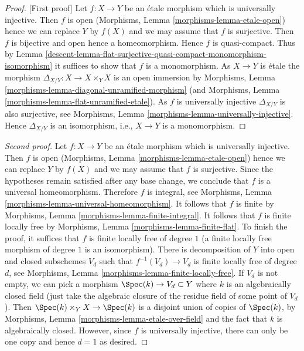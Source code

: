 \begin{proof}
[First proof]
Let $f : X \to Y$ be an \'etale morphism which is universally injective.
Then $f$ is open
(Morphisms, Lemma \ref{morphisms-lemma-etale-open})
hence we can replace $Y$ by $f(X)$ and we may assume that $f$ is surjective.
Then $f$ is bijective and open hence a homeomorphism. Hence $f$ is
quasi-compact. Thus by
Lemma \ref{descent-lemma-flat-surjective-quasi-compact-monomorphism-isomorphism}
it suffices to show that $f$ is a monomorphism. As $X \to Y$ is \'etale
the morphism $\Delta_{X/Y} : X \to X \times_Y X$ is an open immersion by
Morphisms, Lemma \ref{morphisms-lemma-diagonal-unramified-morphism}
(and
Morphisms, Lemma \ref{morphisms-lemma-flat-unramified-etale}).
As $f$ is universally injective $\Delta_{X/Y}$ is also surjective, see
Morphisms, Lemma \ref{morphisms-lemma-universally-injective}.
Hence $\Delta_{X/Y}$ is an isomorphism, i.e., $X \to Y$ is a monomorphism.
\end{proof}

\begin{proof}[Second proof]
Let $f : X \to Y$ be an \'etale morphism which is universally injective.
Then $f$ is open (Morphisms, Lemma \ref{morphisms-lemma-etale-open})
hence we can replace $Y$ by $f(X)$ and we may assume that $f$ is surjective.
Since the hypotheses remain satisfied after any base change, we conclude
that $f$ is a universal homeomorphism. Therefore $f$ is integral, see
Morphisms, Lemma \ref{morphisms-lemma-universal-homeomorphism}.
It follows that $f$ is finite by
Morphisms, Lemma \ref{morphisms-lemma-finite-integral}.
It follows that $f$ is finite locally free by
Morphisms, Lemma \ref{morphisms-lemma-finite-flat}.
To finish the proof, it suffices that $f$ is finite locally
free of degree $1$ (a finite locally free morphism of degree $1$
is an isomorphism).
There is decomposition of $Y$ into open and closed subschemes
$V_d$ such that $f^{-1}(V_d) \to V_d$ is finite locally free of
degree $d$, see Morphisms, Lemma \ref{morphisms-lemma-finite-locally-free}.
If $V_d$ is not empty, we can pick a morphism $\Spec(k) \to V_d \subset Y$
where $k$ is an algebraically closed field (just take the algebraic
closure of the residue field of some point of $V_d$).
Then $\Spec(k) \times_Y X \to \Spec(k)$ is a disjoint union of
copies of $\Spec(k)$, by
Morphisms, Lemma \ref{morphisms-lemma-etale-over-field}
and the fact that $k$ is algebraically closed.
However, since $f$ is universally injective, there can only be
one copy and hence $d = 1$ as desired.
\end{proof}


